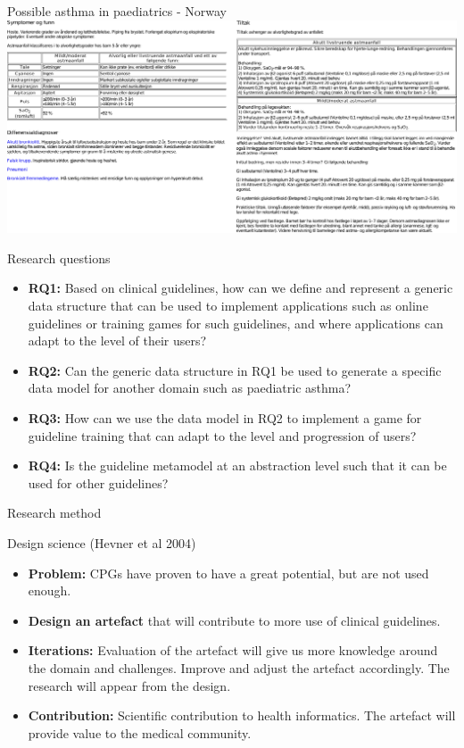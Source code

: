 \documentclass{beamer}
\begin{document}
\begin{frame}{Possible asthma in paediatrics - Norway}
\includegraphics[scale=0.32]{NorwayCPG}
\end{frame}


\begin{frame}{Research questions}
\begin{itemize}
	\item \textbf{RQ1:} Based on clinical guidelines, how can we define and represent a generic data structure that can be used to implement applications such as online guidelines or training games for such guidelines, and where applications can adapt to the level of their users?
	\item \textbf{RQ2:} Can the generic data structure in RQ1 be used to generate a specific data model for another domain such as paediatric asthma?
	\item \textbf{RQ3:} How can we use the data model in RQ2 to implement a game for guideline training that can adapt to the level and progression  of users?
	\item \textbf{RQ4:} Is the guideline metamodel at an abstraction level such that it can be used for other guidelines? 
\end{itemize}
\end{frame}

\begin{frame}{Research method}
\begin{block}{Design science (Hevner et al 2004)}
	\begin{itemize}
		\item \textbf{Problem:} CPGs have proven to have a great potential, but are not used enough.
		\item \textbf{Design an artefact} that will contribute to more use of clinical guidelines.
		\item \textbf{Iterations:} Evaluation of the artefact will give us more knowledge around the domain and challenges. Improve and adjust the artefact accordingly. The research will appear from the design.
		\item \textbf{Contribution:} Scientific contribution to health informatics. The artefact will provide value to the medical community.
	\end{itemize}
\end{block}
\end{frame}
\end{document}
